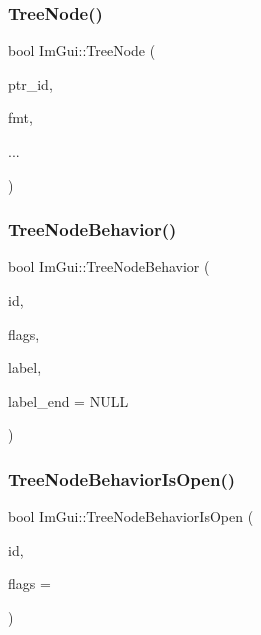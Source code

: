 \mbox{\label{namespaceImGui_a47f1421323f90fdd0a9cbfea2338b10f}} 
\subsubsection{\texorpdfstring{Tree\+Node()}{TreeNode()}\hspace{0.1cm}{\footnotesize\ttfamily [3/3]}}
{\footnotesize\ttfamily bool Im\+Gui\+::\+Tree\+Node (\begin{DoxyParamCaption}\item[{const \hyperlink{imgui__impl__opengl3__loader_8h_ac668e7cffd9e2e9cfee428b9b2f34fa7}{void} $\ast$}]{ptr\+\_\+id,  }\item[{const char $\ast$}]{fmt,  }\item[{}]{... }\end{DoxyParamCaption})}

\mbox{\label{namespaceImGui_a918eabf70d288e93b2519ee1eac2c0b4}} 
\subsubsection{\texorpdfstring{Tree\+Node\+Behavior()}{TreeNodeBehavior()}}
{\footnotesize\ttfamily bool Im\+Gui\+::\+Tree\+Node\+Behavior (\begin{DoxyParamCaption}\item[{Im\+Gui\+ID}]{id,  }\item[{Im\+Gui\+Tree\+Node\+Flags}]{flags,  }\item[{const char $\ast$}]{label,  }\item[{const char $\ast$}]{label\+\_\+end = {\ttfamily NULL} }\end{DoxyParamCaption})}

\mbox{\label{namespaceImGui_a22cc50485aad6da8a3a4e156b500ed4a}} 
\subsubsection{\texorpdfstring{Tree\+Node\+Behavior\+Is\+Open()}{TreeNodeBehaviorIsOpen()}}
{\footnotesize\ttfamily bool Im\+Gui\+::\+Tree\+Node\+Behavior\+Is\+Open (\begin{DoxyParamCaption}\item[{Im\+Gui\+ID}]{id,  }\item[{Im\+Gui\+Tree\+Node\+Flags}]{flags = {} }\end{DoxyParamCaption})\hspace{0.3cm}{\ttfamily [inline]}}

